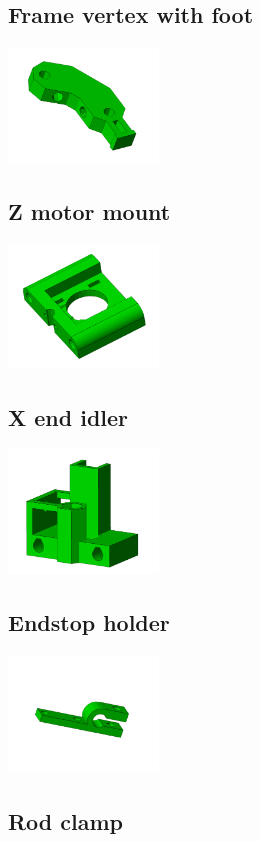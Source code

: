 \documentclass[11pt]{article}
\begin{document}
\subsection{Frame vertex with foot}


\includegraphics[width=4cm]{images/frame-vertex-foot.jpg}
\subsection{Z motor mount}


\includegraphics[width=4cm]{images/z-motor-mount.jpg}
\subsection{X end idler}


\includegraphics[width=4cm]{images/x-end-idler.jpg}
\subsection{Endstop holder}


\includegraphics[width=4cm]{images/endstop-holder.jpg}
\subsection{Rod clamp}
\end{document}
